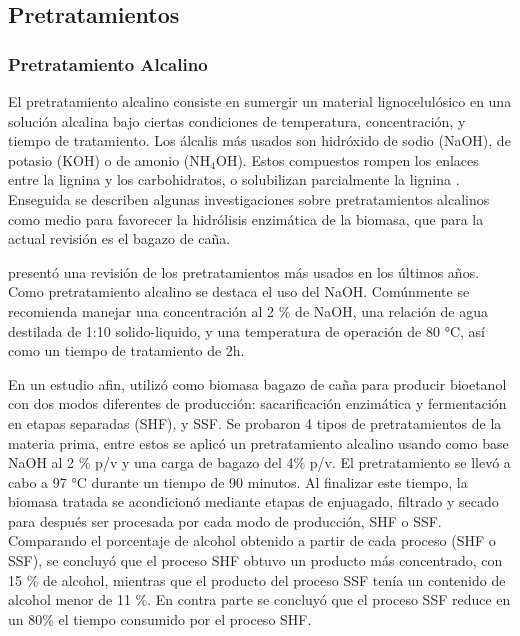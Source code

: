 \documentclass[12pt]{article}
\begin{document}




\subsection{Pretratamientos}



\subsubsection{Pretratamiento Alcalino}

El pretratamiento alcalino consiste en sumergir un material lignocelulósico en una solución alcalina bajo ciertas condiciones de temperatura, concentración, y tiempo de tratamiento. Los álcalis más usados son hidróxido de sodio (NaOH), de potasio (KOH) o de amonio (NH$_4$OH). Estos compuestos rompen los enlaces entre la lignina y los carbohidratos, o solubilizan parcialmente la lignina \cite{Galbe2012}.
Enseguida se describen algunas investigaciones sobre pretratamientos alcalinos como medio para favorecer la hidrólisis enzimática de la biomasa, que para la actual revisión es el bagazo de caña.

\cite{Nasution_2022} presentó una revisión de los pretratamientos más usados en los últimos años. Como pretratamiento alcalino se destaca el uso del NaOH. Comúnmente se recomienda manejar una concentración al 2 \% de NaOH, una relación de agua destilada de 1:10 solido-liquido, y una temperatura de operación de 80 °C, así como un tiempo de tratamiento de 2h.

En un estudio afin, \cite{Arturo2022evaluacion} utilizó como biomasa bagazo de caña para producir bioetanol con dos modos diferentes de producción: sacarificación enzimática y fermentación en etapas separadas (SHF), y SSF. Se probaron 4 tipos de pretratamientos de la materia prima, entre estos se aplicó un pretratamiento alcalino usando como base NaOH al 2 \% p/v y una carga de bagazo del 4\% p/v. El pretratamiento se llevó a cabo a 97 °C durante un tiempo de 90 minutos. Al finalizar este tiempo, la biomasa tratada se acondicionó mediante etapas de enjuagado, filtrado y secado para después ser procesada por cada modo de producción, SHF o SSF. Comparando el porcentaje de alcohol obtenido a partir de cada proceso (SHF o SSF), se concluyó que el proceso SHF obtuvo un producto más concentrado, con 15 \% de alcohol, mientras que el producto del proceso SSF tenía un contenido de alcohol menor de 11 \%. En contra parte se concluyó que el proceso SSF reduce en un 80\% el tiempo consumido por el proceso SHF.
\end{document}

